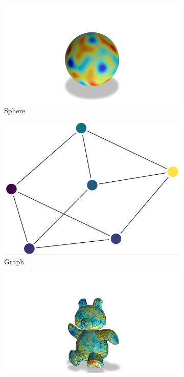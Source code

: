 \begin{figure}[tbh!]
  \centering
\begin{subfigure}{0.3\textwidth}
  \vspace{.3cm}
  \includegraphics[clip, trim=12cm 0cm 12cm 7cm,width=\textwidth]{sphere}
  \caption{Sphere}
  \label{fig:sphere}
\end{subfigure}\hfil %
\begin{subfigure}{0.3\textwidth}
  \includegraphics[clip, trim=0cm .05cm 0cm 0cm, width=\textwidth]{graph}
  \vspace{.5cm}
  \caption{Graph}
  \label{fig:graph}
\end{subfigure}\hfil %
\begin{subfigure}{0.3\textwidth}
  \includegraphics[clip, trim=12cm 0cm 12cm 5cm,width=\textwidth]{teddy_mesh}

\end{subfigure}
\end{figure}
